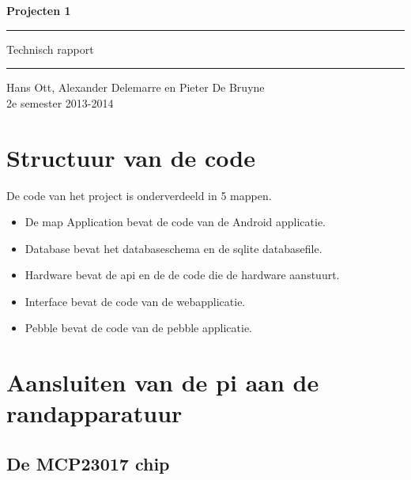 \documentclass[a4paper,12pt]{article}
\begin{document}
\noindent
\begin{titlepage}
\begin{center} 
\vspace*{\fill}

\huge{\bf{Projecten 1}} \\ 
\vspace*{1cm}

\hrule
\vspace*{0.3cm}
\huge{Technisch rapport} \\
\vspace*{0.3cm}
\hrule
\vspace*{1cm}

\large{Hans Ott, Alexander Delemarre en Pieter De Bruyne}\\
\large{2e semester 2013-2014}
\vspace*{0.8cm}


\vspace*{\fill}
\end{center}
\end{titlepage}
\tableofcontents
\newpage

\section{Structuur van de code}

De code van het project is onderverdeeld in 5 mappen.

\begin{itemize}
\item De map Application bevat de code van de Android applicatie.
\item Database bevat het databaseschema en de sqlite databasefile.
\item Hardware bevat de api en de de code die de hardware aanstuurt.
\item Interface bevat de code van de webapplicatie.
\item Pebble bevat de code van de pebble applicatie.
\end{itemize}

\section{Aansluiten van de pi aan de randapparatuur}

\subsection{De MCP23017 chip}
\end{document}
